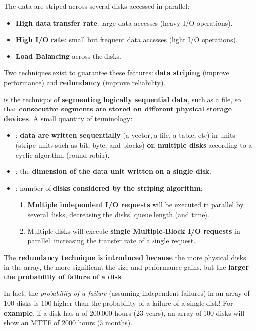\highspace
The data are striped across several disks accessed in parallel:
\begin{itemize}
    \item \textbf{High data transfer rate}: large data accesses (heavy I/O operations).
    \item \textbf{High I/O rate}: small but frequent data accesses (light I/O operations).
    \item \textbf{Load Balancing} across the disks.
\end{itemize}
Two techniques exist to guarantee these features: \textbf{data striping} (improve performance) and \textbf{redundancy} (improve reliability).

\highspace
{} is the technique of \textbf{segmenting logically sequential data}, such as a file, so that \textbf{consecutive segments are stored on different physical storage devices}. A small quantity of terminology:
\begin{itemize}
    \item {}: \textbf{data are written sequentially} (a vector, a file, a table, etc) in units (stripe units such as bit, byte, and blocks) \textbf{on multiple disks} according to a cyclic algorithm (round robin).

    \item {}: the \textbf{dimension of the data unit written on a single disk}.

    \item {}: number of \textbf{disks considered by the striping algorithm}:
    \begin{enumerate}
        \item \textbf{Multiple independent I/O requests} will be executed in parallel by several disks, decreasing the disks' queue length (and time).

        \item Multiple disks will execute \textbf{single Multiple-Block I/O requests} in parallel, increasing the transfer rate of a single request.
    \end{enumerate}
\end{itemize}

\highspace
The \textbf{redundancy technique is introduced because} the more physical disks in the array, the more significant the size and performance gains, but the \textbf{larger the probability of failure of a disk}.

In fact, the \emph{probability of a failure} (assuming independent failures) in an array of 100 disks is 100 higher than the probability of a failure of a single disk! For \textcolor{Green4}{\textbf{example}}, if a disk has a  of 200.000 hours (23 years), an array of 100 disks will show an MTTF of 2000 hours (3 months).

